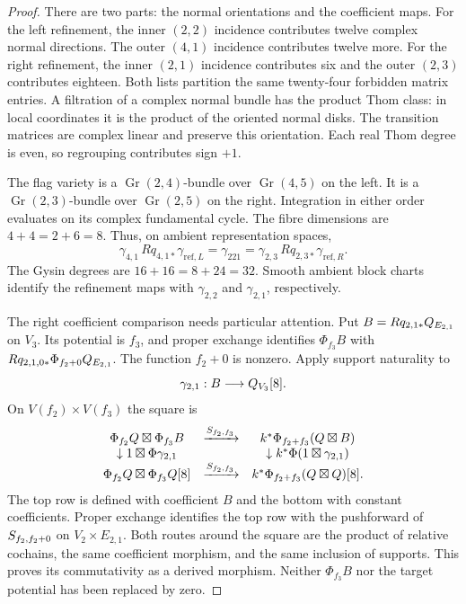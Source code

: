 \begin{proof}
There are two parts: the normal orientations and the coefficient maps.
For the left refinement, the inner $(2,2)$ incidence contributes
twelve complex normal directions. The outer $(4,1)$ incidence
contributes twelve more. For the right refinement, the inner $(2,1)$
incidence contributes six and the outer $(2,3)$ contributes eighteen.
Both lists partition the same twenty-four forbidden matrix entries.
A filtration of a complex normal bundle has the product Thom class:
in local coordinates it is the product of the oriented normal disks.
The transition matrices are complex linear and preserve this orientation.
Each real Thom degree is even, so regrouping contributes sign $+1$.

The flag variety is a $\operatorname{Gr}(2,4)$-bundle over
$\operatorname{Gr}(4,5)$ on the left. It is a
$\operatorname{Gr}(2,3)$-bundle over $\operatorname{Gr}(2,5)$ on
the right. Integration in either order evaluates on its complex
fundamental cycle. The fibre dimensions are $4+4=2+6=8$.
Thus, on ambient representation spaces,
\[
 \gamma_{4,1}\,Rq_{4,1*}\gamma_{\mathrm{ref},L}
       =\gamma_{221}
       =\gamma_{2,3}\,Rq_{2,3*}\gamma_{\mathrm{ref},R}.
\]
The Gysin degrees are $16+16=8+24=32$.
Smooth ambient block charts identify the refinement maps with
$\gamma_{2,2}$ and $\gamma_{2,1}$, respectively.

The right coefficient comparison needs particular attention.
Put $B=Rq_{2,1*}Q_{E_{2,1}}$ on $V_3$.
Its potential is $f_3$, and proper exchange identifies
$\Phi_{f_3}B$ with $Rq_{2,1,0*}\Phi_{f_2+0}Q_{E_{2,1}}$.
The function $f_2+0$ is nonzero. Apply support naturality to
\[
                 \gamma_{2,1}:B\longrightarrow Q_{V_3}[8].
\]
On $V(f_2)\times V(f_3)$ the square is
\[
\begin{array}{ccc}
 \Phi_{f_2}Q\boxtimes\Phi_{f_3}B
 &\xrightarrow{S_{f_2,f_3}}&
 k^*\Phi_{f_2+f_3}(Q\boxtimes B)\\
 \downarrow1\boxtimes\Phi\gamma_{2,1}&&
 \downarrow k^*\Phi(1\boxtimes\gamma_{2,1})\\
 \Phi_{f_2}Q\boxtimes\Phi_{f_3}Q[8]
 &\xrightarrow{S_{f_2,f_3}}&
 k^*\Phi_{f_2+f_3}(Q\boxtimes Q)[8].
\end{array}
\]
The top row is defined with coefficient $B$ and the bottom with
constant coefficients. Proper exchange identifies the top row with
the pushforward of $S_{f_2,f_2+0}$ on $V_2\times E_{2,1}$.
Both routes around the square are the product of relative cochains,
the same coefficient morphism, and the same inclusion of supports.
This proves its commutativity as a derived morphism. Neither
$\Phi_{f_3}B$ nor the target potential has been replaced by zero.


\end{proof}
